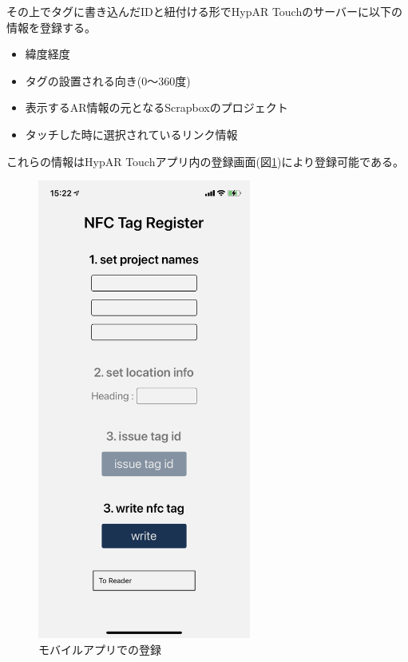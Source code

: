 その上でタグに書き込んだIDと紐付ける形でHypAR Touchのサーバーに以下の情報を登録する。
\begin{itemize}
  \item 緯度経度
  \item タグの設置される向き(0〜360度)
  \item 表示するAR情報の元となるScrapboxのプロジェクト
  \item タッチした時に選択されているリンク情報
\end{itemize}
これらの情報はHypAR Touchアプリ内の登録画面(図\ref{fig:nfc_register_mobile})により登録可能である。

\begin{figure}[h]
  \centering
  \includegraphics[width=70mm]{images/nfc_register_mobile.png}
  \caption{モバイルアプリでの登録} \label{fig:nfc_register_mobile}
\end{figure}
